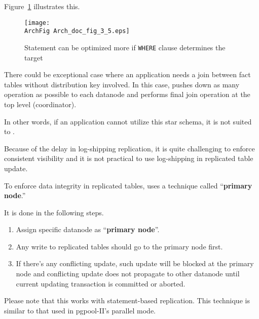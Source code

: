   Figure~\ref{archfig:5_1} illustrates this.
  
  \begin{figure}[htp]
	  \begin{center}
		  \texttt{[image: \\ArchFig Arch\_doc\_fig\_3\_5.eps]}
		  \caption{\label{archfig:5_1}Statement can be optimized more
			  					      if \texttt{WHERE} clause determines the target}
	  \end{center}
  \end{figure}
  
  There could be exceptional case where an application needs a join between fact tables
  without distribution key involved.
  In this case, \XC{} pushes down as many operation as possible to each datanode
  and performs final join operation at the top level (coordinator).
  
  In other words, if an application cannot utilize this star schema, it is not suited to \XC.




  Because of the delay in log-shipping replication,
  it is quite challenging to enforce consistent visibility
  and it is not practical to use log-shipping in replicated table update.
  
  To enforce data integrity in replicated tables, \XC{} uses a technique called
  ``\textbf{primary node}.''
  
  It is done in the following steps.
  
  \begin{enumerate}
	  \item Assign specific datanode as ``{\bf primary node}''.
	  \item Any write to replicated tables should go to the primary node first.
	  \item If there's any conflicting update, such update will be blocked at the primary node
	  		and conflicting update does not propagate to other datanode until current updating
			transaction is committed or aborted.
  \end{enumerate}
  
  Please note that this works with statement-based replication.
  This technique is similar to that used in pgpool-II's parallel mode.



